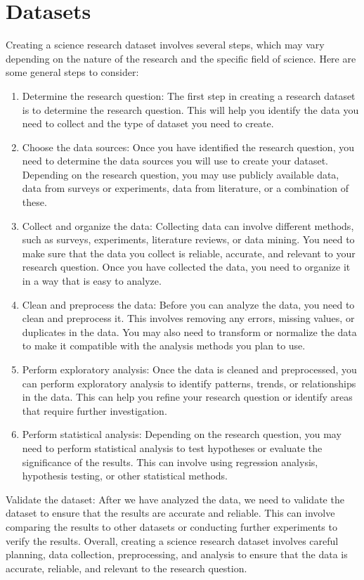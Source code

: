         \section{Datasets} \label{subsec:datasets}
        Creating a science research dataset involves several steps, which may vary depending on the nature of the research and the specific field of science.
        Here are some general steps to consider:
        \begin{enumerate}
            \item Determine the research question: The first step in creating a research dataset is to determine the research question. This will help you
            identify the data you need to collect and the type of dataset you need to create.
            \item Choose the data sources: Once you have identified the research question, you need to determine the data sources you will use to create your dataset.
            Depending on the research question, you may use publicly available data, data from surveys or experiments, data from literature, or a combination of these.
            \item Collect and organize the data: Collecting data can involve different methods, such as surveys, experiments, literature reviews, or data mining.
            You need to make sure that the data you collect is reliable, accurate, and relevant to your research question. Once you have collected the data,
            you need to organize it in a way that is easy to analyze.
            \item Clean and preprocess the data: Before you can analyze the data, you need to clean and preprocess it. This involves removing any errors,
            missing values, or duplicates in the data. You may also need to transform or normalize the data to make it compatible with the analysis
            methods you plan to use.
            \item Perform exploratory analysis: Once the data is cleaned and preprocessed, you can perform exploratory analysis to identify patterns,
            trends, or relationships in the data. This can help you refine your research question or identify areas that require further investigation.
            \item Perform statistical analysis: Depending on the research question, you may need to perform statistical analysis to test
            hypotheses or evaluate the significance of the results. This can involve using regression analysis, hypothesis testing, or other statistical methods.
        \end{enumerate}
        Validate the dataset: After we have analyzed the data, we need to validate the dataset to ensure that the results are accurate and reliable.
        This can involve comparing the results to other datasets or conducting further experiments to verify the results.
        Overall, creating a science research dataset involves careful planning, data collection, preprocessing, and analysis to ensure that the data is accurate,
        reliable, and relevant to the research question.

